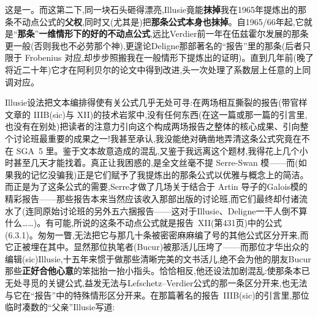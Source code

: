 \dmark{}这是一。而这第二下,同一块石头砸得漂亮,Illusie竟能\textbf{抹掉}我在1965年提炼出的那条不动点公式的\textbf{父权},同时又(尤其是)把\textbf{那条公式本身也抹掉}。自1965/66年起,它就是“\textbf{那条}”\textbf{一维情形下的好的不动点公式},远比Verdier前一年在伍兹霍尔发展的那条更一般(否则我也不必劳那个神),更遑论Deligne那部著名的“报告”里的那条(后者只限于 Frobenius 对应,却步步照搬我在一般情形下提炼出的证明)。直到几年前(晚了将近二十年)它才在阿利贝尔的论文中得到改进,头一次处理了系数层上任意的上同调对应。

Illusie设法把文本编排得使有关公式几乎无处可寻:在两场相互撕裂的报告(带官样文章的 IIIB(sic)与 XII)的技术岩浆中,没有任何东西(在这一篇或那一篇的引言里,也没有在别处)把读者的注意力引向这个构成两场报告之整体的核心成果、引向整个讨论班最重要的成果之一!我甚至承认,我没能绝对确凿地弄清这条公式究竟在不在 SGA~5 里。鉴于文本故意造成的混乱,又鉴于我远离这个题材,我得花上几个小时甚至几天才能找着。真正让我困惑的,是全文丝毫不提 Serre-Swan 模——而(如果我的记忆没骗我)正是它们赋予了我提炼出的那条公式以优雅与概念上的简洁。而正是为了这条公式的需要,Serre才做了几场关于结合于 Artin 导子的Galois模的精彩报告——那些报告本来当然应该收入那部出版的讨论班,而它们最终却付诸流水了(连同原始讨论班的另外五六捆报告——这对于Illusie、Deligne一干人倒不算什么……)。有可能,所说的这条不动点公式就是报告~XII(第431页)中的公式(6.3.1)。匆匆一瞥,无法把它与那几十条被密密麻麻编了号的其他公式区分开来,而它正被埋在其中。显然那位执笔者(Bucur)被那活儿压垮了——而那位才华出众的编辑(sic)Illusie,十五年来惯于做那些清晰完美的文书活儿,绝不会为他的朋友Bucur那些\textbf{正好合他心意}的笨拙抬一抬小指头。恰恰相反,他还设法加剧混乱:使那条本已无处寻觅的关键公式,益发无法与Lefschetz--Verdier公式的那一条区分开来,也无法与它在“报告”中的特殊情形区分开来。在那篇著名的报告~IIIB(sic)的引言里,那位临时凑数的“父亲”Illusie写道:

